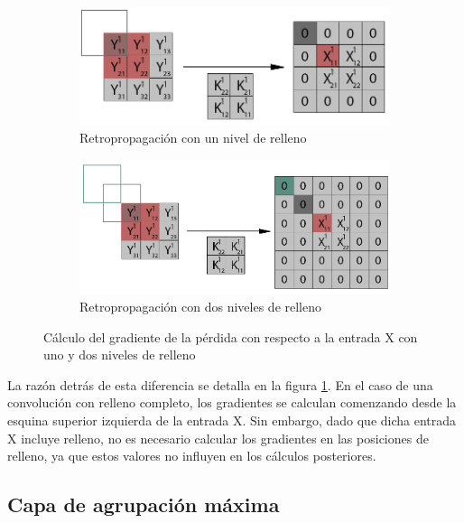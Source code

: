 \begin{figure}[H]
	\centering
	\begin{subfigure}{.5\textwidth}
		\includegraphics[width=1.4\linewidth]{imagenes/full_vs_normal_conv_1.jpg}  
		\caption{Retropropagación con un nivel de relleno}
	\end{subfigure}
	
	\vspace{5mm}
	\begin{subfigure}{.5\textwidth}
		\includegraphics[width=1.4\linewidth]{imagenes/full_vs_normal_conv_2.jpg}  
		\caption{Retropropagación con dos niveles de relleno}
	\end{subfigure}
	\caption{Cálculo del gradiente de la pérdida con respecto a la entrada X con uno y dos niveles de relleno}
	\label{fig:conv_full_vs_normal}
\end{figure}

La razón detrás de esta diferencia se detalla en la figura \ref{fig:conv_full_vs_normal}. En el caso de una convolución con relleno completo, los gradientes se calculan comenzando desde la esquina superior izquierda de la entrada X. Sin embargo, dado que dicha entrada X incluye relleno, no es necesario calcular los gradientes en las posiciones de relleno, ya que estos valores no influyen en los cálculos posteriores.



\subsection{Capa de agrupación máxima}


